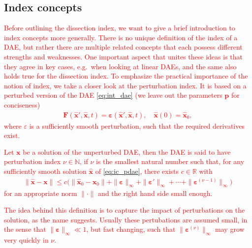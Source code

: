\documentclass[AMA,STIX1COL]{WileyNJD-v2}
\newcommand{\mb}[1]{\mathbf{#1}}
\newcommand{\mbh}[1]{\hat{\mathbf{#1}}}
\begin{document}
\subsection{Index concepts}
\label{subsec:ic}
\textcolor{red}{Before outlining the dissection index, we want to give a brief introduction to index concepts more generally. There is no unique definition of the index of a DAE, but rather there are multiple related concepts that each possess different strengths and weaknesses\cite{mehrmann2015}. One important aspect that unites these ideas is that they agree in key cases, e.g.~when looking at linear DAEs, and the same also holds true for the dissection index. To emphasize the practical importance of the notion of index, we take a closer look at the perturbation index. It is based on a perturbed version of the DAE \eqref{eq:int_dae} (we leave out the parameters $\mb{p}$ for conciseness)
\begin{align}
    \mb{F}(\mbh{x}', \mbh{x}, t) = \boldsymbol{\varepsilon}(\mbh{x}', \mbh{x}, t), \quad \mbh{x}(0) = \mbh{x}_0, \label{eq:ic_pdae}
\end{align}
where $\varepsilon$ is a sufficiently smooth perturbation, such that the required derivatives exist.
\begin{definition}
    \label{def:ic_pi}
    Let $\mb{x}$ be a solution of the unperturbed DAE, then the DAE is said to have perturbation index $\nu \in \mathbb{N}$, if $\nu$ is the smallest natural number such that, for any sufficiently smooth solution $\mbh{x}$ of \eqref{eq:ic_pdae}, there exists $c \in \mathbb{R}$ with
    \begin{align*}
        \| \mbh{x} - \mb{x} \| \leq c \big( \| \mbh{x}_0 - \mb{x}_0 \| + \| \boldsymbol{\varepsilon} \|_\infty + \| \boldsymbol{\varepsilon}' \|_\infty + \dotsb + \| \boldsymbol{\varepsilon}^{(\nu - 1)} \|_\infty \big)
    \end{align*}
    for an appropriate norm $\| \cdot \|$ and the right hand side small enough.
\end{definition}
The idea behind this definition is to capture the impact of perturbations on the solution, as the name suggests. Usually these pertubations are assumed small, in the sense that $\| \boldsymbol{\varepsilon} \|_\infty \ll 1$, but fast changing, such that $\| \boldsymbol{\varepsilon}^{(\nu)} \|_\infty$ may grow very quickly in $\nu$.}
\end{document}
